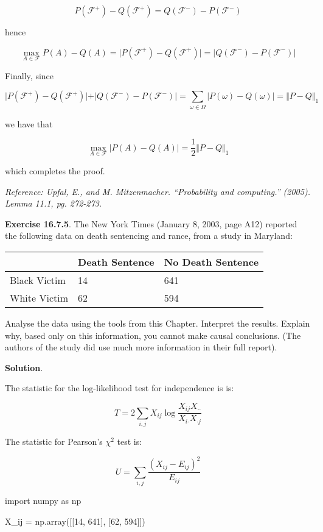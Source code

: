 \[ P(\mathcal{F}^+) - Q(\mathcal{F}^+) = Q(\mathcal{F}^-) - P(\mathcal{F}^-)\]

hence

\[ \max_{A \in \mathcal{F}} P(A) - Q(A) = \vert P(\mathcal{F}^+) - Q(\mathcal{F}^+) \vert = \vert Q(\mathcal{F}^-) - P(\mathcal{F}^-) \vert \]

Finally, since

\[ 
\vert P(\mathcal{F}^+) - Q(\mathcal{F}^+) \vert + \vert Q(\mathcal{F}^-) - P(\mathcal{F}^-) \vert = \sum_{\omega \in \Omega} | P(\omega) - Q(\omega) | = \Vert P - Q \Vert_{1}
\]

we have that

\[ \max_{A \in \mathcal{F}} |P(A) - Q(A)| = \frac{1}{2} \Vert P - Q \Vert_{1} \]

which completes the proof.

\emph{Reference: Upfal, E., and M. Mitzenmacher. ``Probability and
computing.'' (2005). Lemma 11.1, pg. 272-273.}

\textbf{Exercise 16.7.5}. The New York Times (January 8, 2003, page A12)
reported the following data on death sentencing and rance, from a study
in Maryland:

\begin{tabular}{@{}lll@{}}
\toprule
& Death Sentence & No Death Sentence \\
\midrule
Black Victim & 14 & 641 \\
White Victim & 62 & 594 \\
\bottomrule
\end{tabular}

Analyse the data using the tools from this Chapter. Interpret the
results. Explain why, based only on this information, you cannot make
causal conclusions. (The authors of the study did use much more
information in their full report).

\textbf{Solution}.

The statistic for the log-likelihood test for independence is is:

\[ T = 2 \sum_{i, j} X_{ij} \log \frac{X_{ij} X_{\text{··}}}{X_{i\text{·}} X_{\text{·}j}} \]

The statistic for Pearson's \(\chi^{2}\) test is:

\[ U = \sum_{i, j} \frac{(X_{ij} - E_{ij})^{2}}{E_{ij}}\]

\begin{python}
import numpy as np

X_ij = np.array([[14, 641], [62, 594]])
\end{python}

